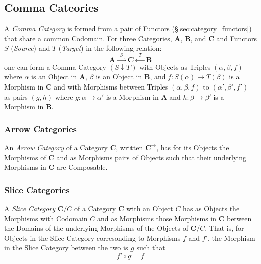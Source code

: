 \documentclass{article}
\begin{document}
\subsection{Comma Cateories}\label{subsec:comma_categories}

A \emph{Comma Category} is formed from a pair of Functors
(\S\ref{sec:category_functors}) that share a common Codomain. For
three Categories, $\mathbf{A}$, $\mathbf{B}$, and $\mathbf{C}$ and
Functors $S$ (\emph{Source}) and $T$ (\emph{Target}) in the following
relation:
\[
    \mathbf{A} \xrightarrow{\;\; S\;\;} \mathbf{C} \xleftarrow{\;\;
      T\;\;} \mathbf{B}
\]
one can form a Comma Category $(S \downarrow T)$ with Objects as
Triples $(\alpha, \beta, f)$ where $\alpha$ is an Object in
$\mathbf{A}$, $\beta$ is an Object in $\mathbf{B}$, and $f : S(\alpha)
\rightarrow T(\beta)$ is a Morphism in $\mathbf{C}$ and with Morphisms
between Triples $(\alpha, \beta, f)$ to $(\alpha', \beta', f')$ as
pairs $(g,h)$ where $g : \alpha \rightarrow \alpha'$ is a Morphism in
$\mathbf{A}$ and $h : \beta \rightarrow \beta'$ is a Morphism in
$\mathbf{B}$.

\subsubsection{Arrow Categories}\label{subsec:arrow_categories}

An \emph{Arrow Category} of a Category $\mathbf{C}$, written
$\mathbf{C^{\rightarrow}}$, has for its Objects the Morphisms of
$\mathbf{C}$ and as Morphisms pairs of Objects such that their
underlying Morphisms in $\mathbf{C}$ are Composable.

\subsubsection{Slice Categories}\label{subsec:slice_categories}

A \emph{Slice Category} $\mathbf{C}/C$ of a Category $\mathbf{C}$ with
an Object $C$ has as Objects the Morphisms with Codomain $C$ and as
Morphisms those Morphisms in $\mathbf{C}$ between the Domains of the
underlying Morphisms of the Objects of $\mathbf{C}/C$. That is, for
Objects in the Slice Category corresonding to Morphisms $f$ and $f'$,
the Morphism in the Slice Category between the two is $g$ such that
\[
    f' \circ g = f
\]
\end{document}
